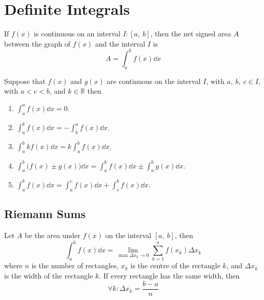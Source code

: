 \documentclass{article}
\begin{document}
\section{Definite Integrals}
\begin{theorem}
    If \(f(x)\) is continuous on an interval \(I:\left[ a,\:b \right]\), then the
    net signed area \(A\) between the graph of \(f(x)\) and the interval \(I\) is
    \begin{equation*}
        A = \int_a^b f(x) \dd{x}
    \end{equation*}
\end{theorem}
\begin{tcolorboxlarge}[title={Properties of Definite Integrals}]
    \begin{theorem}
        Suppose that \(f(x)\) and \(g(x)\) are continuous on the interval \(I\),
        with \(a,\:b,\:c\in I\), with \(a < c < b\), and \(k\in\mathbb{R}\) then
        \begin{enumerate}[label=\normalfont\alph*)] %
            \item \(\displaystyle\int_a^a f(x) \dd{x} = 0\).
            \item \(\displaystyle\int_a^b f(x) \dd{x} = -\int_b^a f(x) \dd{x}\).
            \item \(\displaystyle\int_a^b kf(x) \dd{x} = k\int_a^b f(x) \dd{x}\).
            \item \(\displaystyle\int_a^b \bigl(f(x) \pm g(x)\bigr) \dd{x} = \int_a^b f(x) \dd{x} \pm \int_a^b g(x) \dd{x}\).
            \item \(\displaystyle\int_a^b f(x) \dd{x} = \int_a^c f(x) \dd{x} + \int_c^b f(x) \dd{x}\).
        \end{enumerate}
    \end{theorem}
\end{tcolorboxlarge}
\subsection{Riemann Sums}
\begin{theorem}\label{theorem:1d_riemann_sums}
    Let \(A\) be the area under \(f(x)\) on the interval \(\left[ a,\:b \right]\),
    then
    \begin{equation*}
        \int_a^b f(x) \dd{x} = \lim_{\max{\Delta x_k}\to 0} \sum_{k=1}^n f(x_k) \Delta x_k
    \end{equation*}
    where \(n\) is the number of rectangles, \(x_k\) is the centre of the rectangle
    \(k\), and \(\Delta x_k\) is the width of the rectangle \(k\). If every rectangle
    has the same width, then
    \begin{equation*}
        \forall k:\Delta x_k = \frac{b-a}{n}
    \end{equation*}
\end{theorem}
\end{document}

